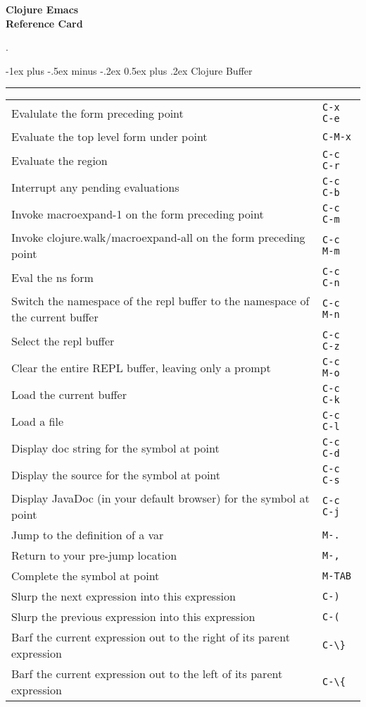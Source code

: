 \documentclass[12pt,landscape]{article}
\makeatletter
\renewcommand{\section}{\@startsection{section}{1}{0mm}%
                                {-1ex plus -.5ex minus -.2ex}%
                                {0.5ex plus .2ex}%
                                {\normalfont\large\bfseries}}
\makeatother
\begin{document}
\raggedright
\footnotesize
\begin{multicols}{3}


\setlength{\premulticols}{1pt}
\setlength{\postmulticols}{1pt}
\setlength{\multicolsep}{1pt}
\setlength{\columnsep}{2pt}

\begin{center}
     \Large{\textbf{Clojure Emacs \\ Reference Card}} \\
\end{center}.

\section{Clojure Buffer}\smallskip \hrule height 2pt \smallskip
\begin{tabular}{p{6cm}p{1cm}} %
	Evalulate the form preceding point    & \verb!C-x C-e!  \\
	Evaluate the top level form under point & \verb!C-M-x! \\
	Evaluate the region & \verb!C-c C-r! \\
	Interrupt any pending evaluations & \verb!C-c C-b! \\
	Invoke macroexpand-1 on the form preceding point & \verb!C-c C-m! \\
	Invoke clojure.walk/macroexpand-all on the form preceding point & \verb!C-c M-m! \\
	Eval the ns form & \verb!C-c C-n! \\
	Switch the namespace of the repl buffer to the namespace of the current buffer & \verb!C-c M-n! \\
	Select the repl buffer & \verb!C-c C-z! \\
	Clear the entire REPL buffer, leaving only a prompt & \verb!C-c M-o! \\
	Load the current buffer & \verb!C-c C-k! \\
	Load a file & \verb!C-c C-l! \\
	Display doc string for the symbol at point & \verb!C-c C-d! \\
	Display the source for the symbol at point & \verb!C-c C-s! \\
	Display JavaDoc (in your default browser) for the symbol at point & \verb!C-c C-j! \\
	Jump to the definition of a var & \verb!M-.! \\
	Return to your pre-jump location & \verb!M-,! \\
	Complete the symbol at point & \verb!M-TAB! \\
	Slurp the next expression into this expression & \verb!C-)! \\
	Slurp the previous expression into this expression & \verb!C-(! \\
	Barf the current expression out to the right of its parent expression & \verb!C-\}! \\
	Barf the current expression out to the left of its parent expression & \verb!C-\{! \\
	

\end{tabular}
\end{multicols}
\end{document}

